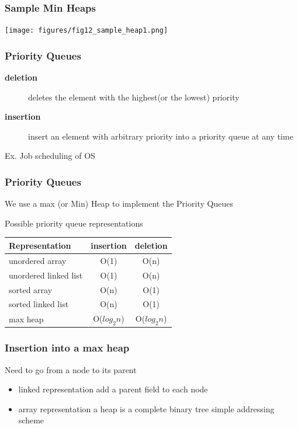 \documentclass[newPxFont,sthlmFooter,nooffset]{beamer}
\begin{document}
\begin{frame}[t]
  \frametitle{Sample Min Heaps}
  \begin{center}
    \texttt{[image: figures/fig12\_sample\_heap1.png]}
  \end{center}

\end{frame}

\begin{frame}[t]
  \frametitle{Priority Queues}
  \begin{description}
  \item [\textbf{deletion}] deletes the element with the highest(or
    the lowest) priority
  \item [\textbf{insertion}] insert an element with arbitrary priority
    into a priority queue at any time
  \end{description}
Ex. Job scheduling of OS
\end{frame}


\begin{frame}[t]
  \frametitle{Priority Queues}
We use a max (or Min) Heap to implement the Priority Queues

Possible priority queue representations

\begin{tabular}{l c c}
  Representation & insertion & deletion \\ \hline \hline
unordered array & O(1) & O(n) \\
unordered linked list & O(1) & O(n) \\
sorted array & O(n) & O(1) \\
sorted linked list & O(n) & O(1) \\
max heap & O($log_2n$) &  O($log_2n$) \\
\end{tabular}
\end{frame}


\begin{frame}[t]
  \frametitle{Insertion into a max heap}
Need to go from a node to its parent
\begin{itemize}
\item linked representation add a parent field to each node
  \item array representation a heap is a complete binary tree simple
    addressing scheme
\end{itemize}
\end{frame}
\end{document}
